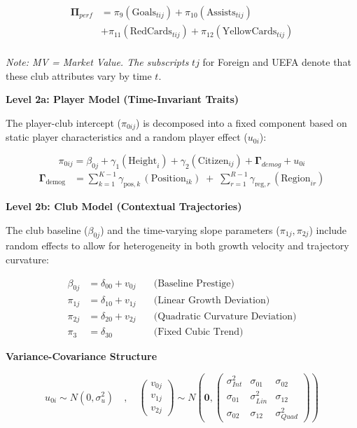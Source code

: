 \documentclass[
  12pt,
]{article}
\begin{document}
\[\begin{aligned}
\boldsymbol{\Pi}_{perf}
&=
\pi_9(\text{Goals}_{tij}) 
+ \pi_{10}(\text{Assists}_{tij}) \\ &
+ \pi_{11}(\text{RedCards}_{tij}) 
+ \pi_{12}(\text{YellowCards}_{tij})\\ &
\end{aligned}\]

\emph{Note: MV = Market Value. The subscripts} \({tj}\) for Foreign and
UEFA denote that these club attributes vary by time \(t\).

\textbf{Level 2a: Player Model (Time-Invariant Traits)}

The player-club intercept (\(\pi_{0ij}\)) is decomposed into a fixed
component based on static player characteristics and a random player
effect (\(u_{0i}\)):

\[ \pi_{0ij} = \beta_{0j} + \gamma_{1}(\text{Height}_{i}) + \gamma_{2}(\text{Citizen}_{ij}) + \mathbf{\Gamma}_{demog} + u_{0i} \]
\[\begin{aligned}
\mathbf{\Gamma}_{\text{demog}}
&=
\sum_{k=1}^{K-1} \gamma_{\text{pos},k} \, 
(\text{Position}_{ik})
\;+\;
\sum_{r=1}^{R-1} \gamma_{\text{reg},r} \, (\text{Region}_{ir})
\end{aligned}\]

\textbf{Level 2b: Club Model (Contextual Trajectories)}

The club baseline (\(\beta_{0j}\)) and the time-varying slope parameters
(\(\pi_{1j}, \pi_{2j}\)) include random effects to allow for
heterogeneity in both growth velocity and trajectory curvature:

\[ \begin{aligned} \beta_{0j} &= \delta_{00} + v_{0j} \quad &\text{(Baseline Prestige)} \\ \pi_{1j} &= \delta_{10} + v_{1j} \quad &\text{(Linear Growth Deviation)} \\ \pi_{2j} &= \delta_{20} + v_{2j} \quad &\text{(Quadratic Curvature Deviation)} \\ \pi_{3} &= \delta_{30} \quad &\text{(Fixed Cubic Trend)} \end{aligned} \]

\textbf{Variance-Covariance Structure}

\[ u_{0i} \sim N(0, \sigma^2_{u}) \quad , \quad  \begin{pmatrix} v_{0j} \\ v_{1j} \\ v_{2j} \end{pmatrix} \sim N \left( \mathbf{0}, \begin{pmatrix} \sigma^2_{Int} & \sigma_{01} & \sigma_{02} \\ \sigma_{01} & \sigma^2_{Lin} & \sigma_{12} \\ \sigma_{02} & \sigma_{12} & \sigma^2_{Quad} \end{pmatrix} \right) \]
\end{document}
